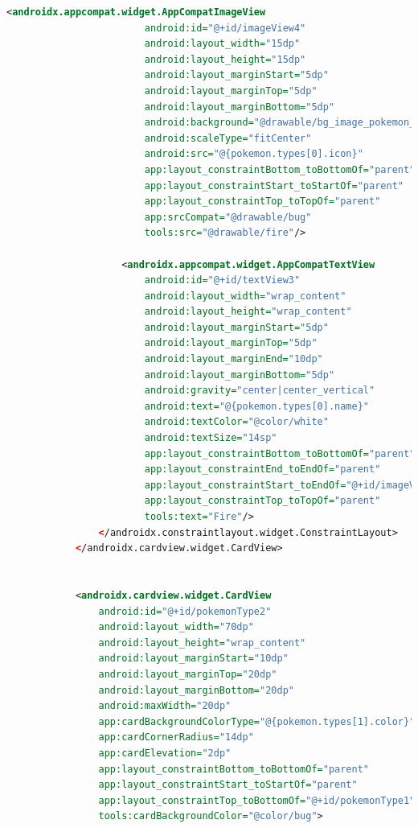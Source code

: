 \documentclass[a4paper, 12pt]{article}
\begin{document}
\begin{lstlisting}[caption={Binding property Region.}, label={code:binding_region_code}, language=XML]
                    <androidx.appcompat.widget.AppCompatImageView
                        android:id="@+id/imageView4"
                        android:layout_width="15dp"
                        android:layout_height="15dp"
                        android:layout_marginStart="5dp"
                        android:layout_marginTop="5dp"
                        android:layout_marginBottom="5dp"
                        android:background="@drawable/bg_image_pokemon_type"
                        android:scaleType="fitCenter"
                        android:src="@{pokemon.types[0].icon}"
                        app:layout_constraintBottom_toBottomOf="parent"
                        app:layout_constraintStart_toStartOf="parent"
                        app:layout_constraintTop_toTopOf="parent"
                        app:srcCompat="@drawable/bug"
                        tools:src="@drawable/fire"/>

                    <androidx.appcompat.widget.AppCompatTextView
                        android:id="@+id/textView3"
                        android:layout_width="wrap_content"
                        android:layout_height="wrap_content"
                        android:layout_marginStart="5dp"
                        android:layout_marginTop="5dp"
                        android:layout_marginEnd="10dp"
                        android:layout_marginBottom="5dp"
                        android:gravity="center|center_vertical"
                        android:text="@{pokemon.types[0].name}"
                        android:textColor="@color/white"
                        android:textSize="14sp"
                        app:layout_constraintBottom_toBottomOf="parent"
                        app:layout_constraintEnd_toEndOf="parent"
                        app:layout_constraintStart_toEndOf="@+id/imageView4"
                        app:layout_constraintTop_toTopOf="parent"
                        tools:text="Fire"/>
                </androidx.constraintlayout.widget.ConstraintLayout>
            </androidx.cardview.widget.CardView>


            <androidx.cardview.widget.CardView
                android:id="@+id/pokemonType2"
                android:layout_width="70dp"
                android:layout_height="wrap_content"
                android:layout_marginStart="10dp"
                android:layout_marginTop="20dp"
                android:layout_marginBottom="20dp"
                android:maxWidth="20dp"
                app:cardBackgroundColorType="@{pokemon.types[1].color}"
                app:cardCornerRadius="14dp"
                app:cardElevation="2dp"
                app:layout_constraintBottom_toBottomOf="parent"
                app:layout_constraintStart_toStartOf="parent"
                app:layout_constraintTop_toBottomOf="@+id/pokemonType1"
                tools:cardBackgroundColor="@color/bug">



\end{lstlisting}
\end{document}
